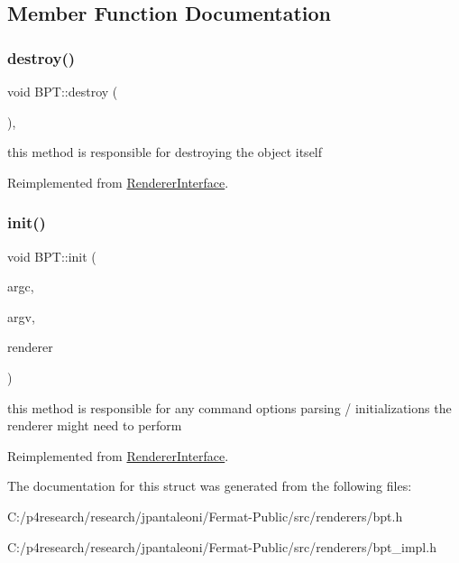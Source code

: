 \subsection{Member Function Documentation}
\mbox{\label{struct_b_p_t_aef80ec5312cbbf38e5dc9e6c37058825}} 
\subsubsection{\texorpdfstring{destroy()}{destroy()}}
{\footnotesize\ttfamily void B\+P\+T\+::destroy (\begin{DoxyParamCaption}{ }\end{DoxyParamCaption})\hspace{0.3cm}{\ttfamily [inline]}, {\ttfamily [virtual]}}

this method is responsible for destroying the object itself 

Reimplemented from \hyperlink{struct_renderer_interface_a7469218aafa029a3e22bac2c00dca9f5}{Renderer\+Interface}.

\mbox{\label{struct_b_p_t_a45040344b72bde12d338c2b1969fba64}} 
\subsubsection{\texorpdfstring{init()}{init()}}
{\footnotesize\ttfamily void B\+P\+T\+::init (\begin{DoxyParamCaption}\item[{int}]{argc,  }\item[{char $\ast$$\ast$}]{argv,  }\item[{\hyperlink{struct_rendering_context}{Rendering\+Context} \&}]{renderer }\end{DoxyParamCaption})\hspace{0.3cm}{\ttfamily [virtual]}}

this method is responsible for any command options parsing / initializations the renderer might need to perform 

Reimplemented from \hyperlink{struct_renderer_interface_a2ead9b943d6d48fcd32872e0005ebe63}{Renderer\+Interface}.



The documentation for this struct was generated from the following files\+:\begin{DoxyCompactItemize}
\item 
C\+:/p4research/research/jpantaleoni/\+Fermat-\/\+Public/src/renderers/bpt.\+h\item 
C\+:/p4research/research/jpantaleoni/\+Fermat-\/\+Public/src/renderers/bpt\+\_\+impl.\+h\end{DoxyCompactItemize}
